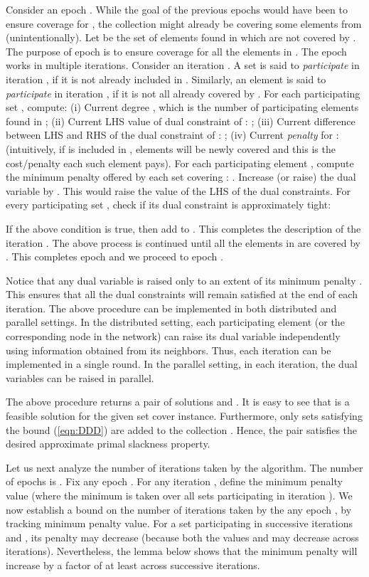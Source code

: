 \documentclass[11pt]{article}
\begin{document}
Consider an epoch . While the goal of the previous  epochs would have been to ensure coverage 
for , the collection  might already be covering some elements from  
(unintentionally). Let  be the set of elements found in  which are not covered by .
The purpose of epoch  is to ensure coverage for all the elements in .
The epoch  works in multiple iterations.
Consider an iteration .
A set  is said to {\em participate} in iteration , if it is not already included in .
Similarly, an element  is said to {\em participate} in iteration ,
if it is not all already covered by .
For each participating set , compute: 
(i) Current degree , which is the number of participating elements found in ; 
(ii) Current LHS value of dual constraint of : ;
(iii) Current difference between LHS and RHS of the dual constraint of :
;
(iv) Current {\em penalty} for :  
(intuitively, if  is included in ,  elements will be newly covered and this is the cost/penalty
each such element pays).
For each participating element , compute the minimum penalty offered by each 
set covering : .
Increase (or raise) the dual variable  by .
This would raise the value of the LHS of the dual constraints.
For every participating set , check if its dual constraint is approximately tight:

If the above condition is true, then add  to .
This completes the description of the iteration . 
The above process is continued until all the elements in  are covered by .
This completes epoch  and we proceed to epoch .

Notice that any dual variable  is raised only to an extent of its minimum penalty .
This ensures that all the dual constraints will remain satisfied at the end of each iteration.
The above procedure can be implemented in both distributed and parallel settings.
In the distributed setting, each participating element (or the corresponding node in the network)
can raise its dual variable  independently using information obtained from its neighbors.
Thus, each iteration can be implemented in a single round.
In the parallel setting, in each iteration, the dual variables can be raised in parallel.

The above procedure returns a pair of solutions  and .
It is easy to see that  is a feasible solution  for the given
set cover instance. Furthermore, only sets satisfying the bound (\ref{eqn:DDD})
are added to the collection . Hence, the pair satisfies the
desired approximate primal slackness property.

Let us next analyze the number of iterations taken by the algorithm.
The number of epochs is . Fix any epoch .
For any iteration , define the minimum penalty value  
(where the minimum is taken over all sets participating in iteration ). 
We now establish a bound on the number of iterations taken by the any epoch ,
by tracking minimum penalty value.
For a set  participating in successive iterations  and ,
its penalty may decrease (because both the values  and  may decrease across iterations).
Nevertheless, the lemma below shows that the minimum penalty will increase by a factor of at 
least  across successive iterations. 
\end{document}
